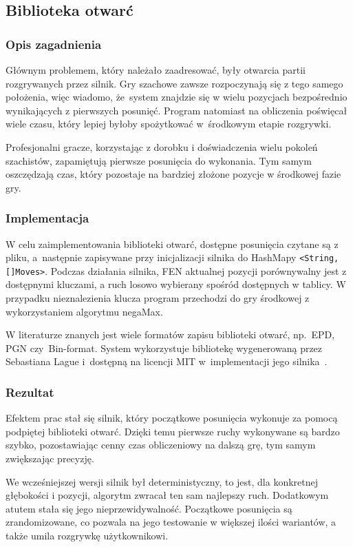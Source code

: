 \subsection{Biblioteka otwarć}
\label{subsec:biblioteka-otwarc}

\subsubsection{Opis zagadnienia}
Głównym problemem, który należało zaadresować, były otwarcia partii rozgrywanych przez silnik.
Gry szachowe zawsze rozpoczynają się z tego samego położenia, więc wiadomo, że~system znajdzie się w wielu pozycjach bezpośrednio wynikających z pierwszych posunięć.
Program natomiast na obliczenia poświęcał wiele czasu, który lepiej byłoby spożytkować w~środkowym etapie rozgrywki.

Profesjonalni gracze, korzystając z dorobku i doświadczenia wielu pokoleń szachistów, zapamiętują pierwsze posunięcia do wykonania.
Tym samym oszczędzają czas, który pozostaje na bardziej złożone pozycje w środkowej fazie gry.

\subsubsection{Implementacja}
W celu zaimplementowania biblioteki otwarć, dostępne posunięcia czytane są z pliku, a~następnie zapisywane przy inicjalizacji silnika do HashMapy \texttt{<String, []Moves>}.
Podczas działania silnika, FEN aktualnej pozycji porównywalny jest z dostępnymi kluczami, a ruch losowo wybierany spośród dostępnych w tablicy.
W przypadku nieznalezienia klucza program przechodzi do gry środkowej z wykorzystaniem algorytmu negaMax.

W literaturze znanych jest wiele formatów zapisu biblioteki otwarć, np.\ EPD, PGN czy~Bin-format.
System wykorzystuje bibliotekę wygenerowaną przez Sebastiana Lague i~dostępną na licencji MIT w~implementacji jego silnika~\cite*{opening-library}.
\subsubsection{Rezultat}
Efektem prac stał się silnik, który początkowe posunięcia wykonuje za pomocą podpiętej biblioteki otwarć.
Dzięki temu pierwsze ruchy wykonywane są bardzo szybko, pozostawiając cenny czas obliczeniowy na dalszą grę, tym samym zwiększając precyzję.

We wcześniejszej wersji silnik był deterministyczny, to jest, dla konkretnej głębokości i pozycji, algorytm zwracał ten sam najlepszy ruch.
Dodatkowym atutem stała się jego nieprzewidywalność.
Początkowe posunięcia są zrandomizowane, co pozwala na jego testowanie w większej ilości wariantów, a także umila rozgrywkę użytkownikowi.
